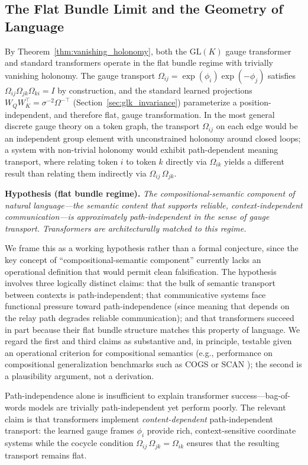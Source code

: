 \documentclass[twoside,11pt]{article}
\begin{document}
\subsection{The Flat Bundle Limit and the Geometry of Language}
\label{sec:flat_bundle}

By Theorem~\ref{thm:vanishing_holonomy}, both the $\mathrm{GL}(K)$ gauge transformer and standard transformers operate in the flat bundle regime with trivially vanishing holonomy. The gauge transport $\Omega_{ij} = \exp(\phi_i)\exp(-\phi_j)$ satisfies $\Omega_{ij}\Omega_{jk}\Omega_{ki} = I$ by construction, and the standard learned projections $W_Q W_K^\top = \sigma^{-2}\Omega^{-\top}$ (Section~\ref{sec:glk_invariance}) parameterize a position-independent, and therefore flat, gauge transformation. In the most general discrete gauge theory on a token graph, the transport $\Omega_{ij}$ on each edge would be an independent group element with unconstrained holonomy around closed loops; a system with non-trivial holonomy would exhibit path-dependent meaning transport, where relating token $i$ to token $k$ directly via $\Omega_{ik}$ yields a different result than relating them indirectly via $\Omega_{ij}\,\Omega_{jk}$.

\textbf{Hypothesis (flat bundle regime).} \emph{The compositional-semantic component of natural language---the semantic content that supports reliable, context-independent communication---is approximately path-independent in the sense of gauge transport. Transformers are architecturally matched to this regime.}

We frame this as a working hypothesis rather than a formal conjecture, since the key concept of ``compositional-semantic component'' currently lacks an operational definition that would permit clean falsification. The hypothesis involves three logically distinct claims: that the bulk of semantic transport between contexts is path-independent; that communicative systems face functional pressure toward path-independence (since meaning that depends on the relay path degrades reliable communication); and that transformers succeed in part because their flat bundle structure matches this property of language. We regard the first and third claims as substantive and, in principle, testable given an operational criterion for compositional semantics (e.g., performance on compositional generalization benchmarks such as COGS \citep{kim2020cogs} or SCAN \citep{lake2018generalization}); the second is a plausibility argument, not a derivation.

Path-independence alone is insufficient to explain transformer success---bag-of-words models are trivially path-independent yet perform poorly. The relevant claim is that transformers implement \emph{content-dependent} path-independent transport: the learned gauge frames $\phi_i$ provide rich, context-sensitive coordinate systems while the cocycle condition $\Omega_{ij}\,\Omega_{jk} = \Omega_{ik}$ ensures that the resulting transport remains flat.
\end{document}
